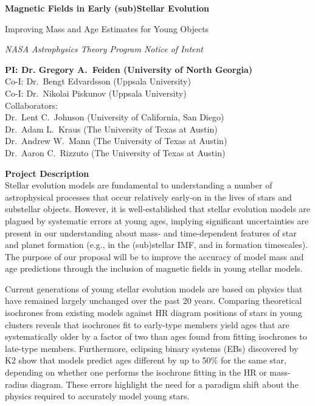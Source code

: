 \documentclass[12pt,letter]{article}
\begin{document}
\thispagestyle{plain}


\begin{center}
	{\bf {\Large Magnetic Fields in Early (sub)Stellar Evolution}
	
	{\large Improving Mass and Age Estimates for Young Objects}}
	
	\emph{NASA Astrophysics Theory Program Notice of Intent} 
\end{center}

\begin{center}
	{\bf PI: Dr. Gregory A.~Feiden (University of North Georgia)} \\
	Co-I: Dr.~Bengt Edvardsson (Uppsala University) \\
	Co-I: Dr.~Nikolai Piskunov (Uppsala University) \\
	Collaborators: \\
	Dr.~Lent C.~Johnson (University of California, San Diego) \\
	Dr.~Adam L.~Kraus (The University of Texas at Austin) \\
	Dr.~Andrew W.~Mann (The University of Texas at Austin) \\
	Dr.~Aaron C.~Rizzuto (The University of Texas at Austin) \\
\end{center}

{\bf Project Description} \\
Stellar evolution models are fundamental to understanding a number of astrophysical processes that occur relatively early-on in the lives of stars and substellar objects. However, it is well-established that stellar evolution models are plagued by systematic errors at young ages, implying significant uncertainties are present in our understanding about mass- and time-dependent features of star and planet formation (e.g., in the (sub)stellar IMF, and in formation timescales). The purpose of our proposal will be to improve the accuracy of model mass and age predictions through the inclusion of magnetic fields in young stellar models.

Current generations of young stellar evolution models are based on physics that have remained largely unchanged over the past 20 years. Comparing theoretical isochrones from existing models against HR diagram positions of stars in young clusters reveals that isochrones fit to early-type members yield ages that are systematically older by a factor of two than ages found from fitting isochrones to late-type members. Furthermore, eclipsing binary systems (EBs) discovered by K2 show that models predict ages different by up to 50\% for the same star, depending on whether one performs the isochrone fitting in the HR or mass-radius diagram. These errors highlight the need for a paradigm shift about the physics required to accurately model young stars.
\end{document}
